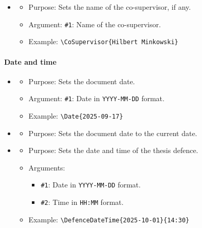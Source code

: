 \begin{itemize}[noitemsep]
\item {}
\begin{itemize}[noitemsep]
  \item \textsf{Purpose:} Sets the name of the co-supervisor, if any.
  \item \textsf{Argument:} \texttt{\#1}: Name of the co-supervisor.
  \item \textsf{Example:} \verb|\CoSupervisor{Hilbert Minkowski}|
\end{itemize}
\end{itemize}

\paragraph{Date and time}
\begin{itemize}[noitemsep]
\item {}
\begin{itemize}[noitemsep]
  \item \textsf{Purpose:} Sets the document date.
  \item \textsf{Argument:} \texttt{\#1}: Date in {\tt YYYY-MM-DD} format.
  \item \textsf{Example:} \verb|\Date{2025-09-17}|
\end{itemize}

\item {}
\begin{itemize}[noitemsep]
  \item \textsf{Purpose:} Sets the document date to the current date.
\end{itemize}

\item {}
\begin{itemize}[noitemsep]
  \item \textsf{Purpose:} Sets the date and time of the thesis defence.
  \item \textsf{Arguments:}
    \begin{itemize}
      \item \texttt{\#1}: Date in {\tt YYYY-MM-DD} format.
      \item \texttt{\#2}: Time in {\tt HH:MM} format.
    \end{itemize}
  \item \textsf{Example:} \verb|\DefenceDateTime{2025-10-01}{14:30}|
\end{itemize}
\end{itemize}

